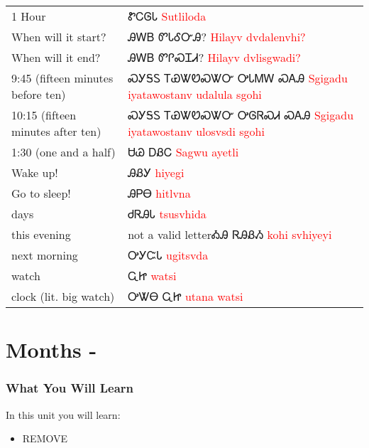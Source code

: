 \vfill\newpage\begin{minipage}{\linewidth}\begin{tabular}{p{3cm} p{11cm}}
1 Hour & ᏑᏟᎶᏓ 
 \newline \textcolor{red}{Sutliloda}\\
When will it start? & ᎯᎳᏴ ᏛᏓᎴᏅᎯ? 
 \newline \textcolor{red}{Hilayv dvdalenvhi?}\\
When will it end? & ᎯᎳᏴ ᏛᎵᏍᏆᏗ? 
 \newline \textcolor{red}{Hilayv dvlisgwadi?}\\
9:45 (fifteen minutes before ten) & ᏍᎩᎦᏚ ᎢᏯᏔᏬᏍᏔᏅ ᎤᏓᎷᎳ ᏍᎪᎯ 
 \newline \textcolor{red}{Sgigadu iyatawostanv udalula sgohi}\\
10:15 (fifteen minutes after ten) & ᏍᎩᎦᏚ ᎢᏯᏔᏬᏍᏔᏅ ᎤᎶᏒᏍᏗ ᏍᎪᎯ 
 \newline \textcolor{red}{Sgigadu iyatawostanv ulosvsdi sgohi}\\
1:30 (one and a half) & ᏌᏊ ᎠᏰᏟ 
 \newline \textcolor{red}{Sagwu ayetli}\\
Wake up! & ᎯᏰᎩ 
 \newline \textcolor{red}{hiyegi}\\
Go to sleep! & ᎯᏢᎾ 
 \newline \textcolor{red}{hitlvna}\\
days & ᏧᏒᎯᏓ 
 \newline \textcolor{red}{tsusvhida}\\
this evening & not a valid letterᎣᎯ ᏒᎯᏰᏱ 
 \newline \textcolor{red}{kohi svhiyeyi}\\
next morning & ᎤᎩᏨᏓ 
 \newline \textcolor{red}{ugitsvda}\\
watch & ᏩᏥ 
 \newline \textcolor{red}{watsi}\\
clock (lit. big watch) & ᎤᏔᎾ ᏩᏥ 
 \newline \textcolor{red}{utana watsi}\\
\end{tabular}
\end{minipage}

  \cite{walcpp42}\cite{walcpp47}
\index{}
\chapter{Months - }
\subsection{What You Will Learn}
In this unit you will learn:
\begin{itemize}
\item REMOVE
\end{itemize}\newpage

